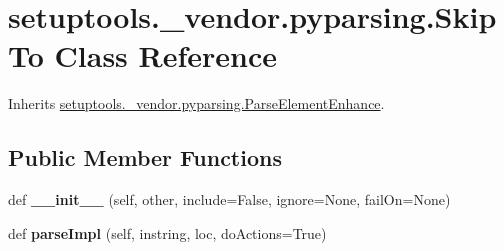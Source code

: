 \hypertarget{classsetuptools_1_1__vendor_1_1pyparsing_1_1_skip_to}{}\section{setuptools.\+\_\+vendor.\+pyparsing.\+Skip\+To Class Reference}
\label{classsetuptools_1_1__vendor_1_1pyparsing_1_1_skip_to}


Inherits \hyperlink{classsetuptools_1_1__vendor_1_1pyparsing_1_1_parse_element_enhance}{setuptools.\+\_\+vendor.\+pyparsing.\+Parse\+Element\+Enhance}.

\subsection*{Public Member Functions}
\begin{DoxyCompactItemize}
\item 
\mbox{\label{classsetuptools_1_1__vendor_1_1pyparsing_1_1_skip_to_a68b2183fe7c02ee31f00d63e3ed1b1f5}} 
def {\bfseries \+\_\+\+\_\+init\+\_\+\+\_\+} (self, other, include=False, ignore=None, fail\+On=None)
\item 
\mbox{\label{classsetuptools_1_1__vendor_1_1pyparsing_1_1_skip_to_af945a9301b2c1f76ea872410bfff218b}} 
def {\bfseries parse\+Impl} (self, instring, loc, do\+Actions=True)
\end{DoxyCompactItemize}

